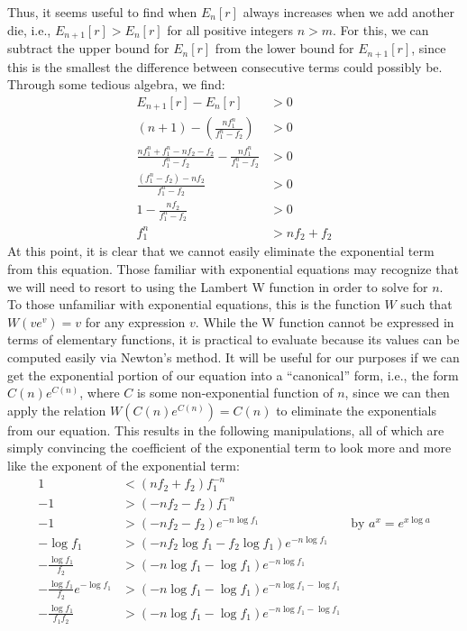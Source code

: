 \documentclass{article}
\begin{document}
Thus, it seems useful to find when $E_n[r]$ always increases when we add another die, i.e., $E_{n+1}[r] > E_n[r]$ for all positive integers $n > m$.
For this, we can subtract the upper bound for $E_n[r]$ from the lower bound for $E_{n+1}[r]$, since this is the smallest the difference between consecutive terms could possibly be.
Through some tedious algebra, we find:
\begin{align}
    E_{n+1}[r] - E_n[r] &> 0 \\
    (n + 1) - \left( \frac{nf_1^n}{f_1^n - f_2} \right) &> 0 \\
    \frac{nf_1^n + f_1^n-nf_2-f_2}{f_1^n-f_2} - \frac{nf_1^n}{f_1^n - f_2} &> 0 \\
    \frac{(f_1^n-f_2) - nf_2}{f_1^n-f_2} &> 0 \\
    1 - \frac{nf_2}{f_1^n-f_2} &> 0 \\
    f_1^n &>nf_2 + f_2
\end{align}
At this point, it is clear that we cannot easily eliminate the exponential term from this equation.
Those familiar with exponential equations may recognize that we will need to resort to using the Lambert W function in order to solve for $n$.
To those unfamiliar with exponential equations, this is the function $W$ such that $W(ve^v)=v$ for any expression $v$. 
While the W function cannot be expressed in terms of elementary functions, it is practical to evaluate because its values can be computed easily via Newton's method.
It will be useful for our purposes if we can get the exponential portion of our equation into a ``canonical'' form, i.e., the form $C(n)e^{C(n)}$, where $C$ is some non-exponential function of $n$, since we can then apply the relation $W(C(n)e^{C(n)})=C(n)$ to eliminate the exponentials from our equation.
This results in the following manipulations, all of which are simply convincing the coefficient of the exponential term to look more and more like the exponent of the exponential term:
\begin{align}
    1 &< (nf_2+f_2)f_1^{-n} \\
    -1 &> (-nf_2-f_2)f_1^{-n} \\
    -1 &> (-nf_2-f_2)e^{-n\log{f_1}} & \text{by } a^x=e^{x\log{a}}\\
    -\log{f_1} &> (-nf_2\log{f_1}-f_2\log{f_1})e^{-n\log{f_1}}\\
    -\frac{\log{f_1}}{f_2} &> (-n\log{f_1}-\log{f_1})e^{-n\log{f_1}}\\
    -\frac{\log{f_1}}{f_2}e^{-\log{f_1}} &> (-n\log{f_1}-\log{f_1})e^{-n\log{f_1}-\log{f_1}}\\
    -\frac{\log{f_1}}{f_1f_2} &> (-n\log{f_1}-\log{f_1})e^{-n\log{f_1}-\log{f_1}}
\end{align}
\end{document}
